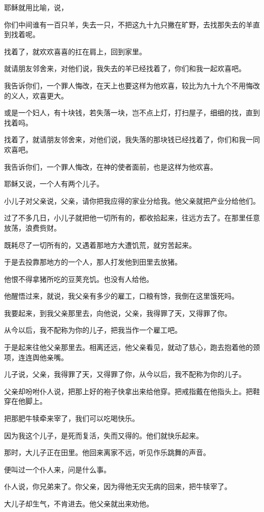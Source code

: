 \documentclass[12pt,oneside]{book}
\begin{document}
耶稣就用比喻，说，

你们中间谁有一百只羊，失去一只，不把这九十九只撇在旷野，去找那失去的羊直到找着呢。

找着了，就欢欢喜喜的扛在肩上，回到家里。

就请朋友邻舍来，对他们说，我失去的羊已经找着了，你们和我一起欢喜吧。

我告诉你们，一个罪人悔改，在天上也要这样为他欢喜，较比为九十九个不用悔改的义人，欢喜更大。

或是一个妇人，有十块钱，若失落一块，岂不点上灯，打扫屋子，细细的找，直到找着吗。

找着了，就请朋友邻舍来，对他们说，我失落的那块钱已经找着了，你们和我一同欢喜吧。

我告诉你们，一个罪人悔改，在神的使者面前，也是这样为他欢喜。

耶稣又说，一个人有两个儿子。

小儿子对父亲说，父亲，请你把我应得的家业分给我。他父亲就把产业分给他们。

过了不多几日，小儿子就把他一切所有的，都收拾起来，往远方去了。在那里任意放荡，浪费赀财。

既耗尽了一切所有的，又遇着那地方大遭饥荒，就穷苦起来。

于是去投靠那地方的一个人，那人打发他到田里去放猪。

他恨不得拿猪所吃的豆荚充饥。也没有人给他。

他醒悟过来，就说，我父亲有多少的雇工，口粮有馀，我倒在这里饿死吗。

我要起来，到我父亲那里去，向他说，父亲，我得罪了天，又得罪了你。

从今以后，我不配称为你的儿子，把我当作一个雇工吧。

于是起来往他父亲那里去。相离还远，他父亲看见，就动了慈心，跑去抱着他的颈项，连连舆他亲嘴。

儿子说，父亲，我得罪了天，又得罪了你，从今以后，我不配称为你的儿子。

父亲却吩咐仆人说，把那上好的袍子快拿出来给他穿。把戒指戴在他指头上。把鞋穿在他脚上。

把那肥牛犊牵来宰了，我们可以吃喝快乐。

因为我这个儿子，是死而复活，失而又得的。他们就快乐起来。

那时，大儿子正在田里。他回来离家不远，听见作乐跳舞的声音。

便叫过一个仆人来，问是什么事。

仆人说，你兄弟来了。你父亲，因为得他无灾无病的回来，把牛犊宰了。

大儿子却生气，不肯进去。他父亲就出来劝他。
\end{document}
